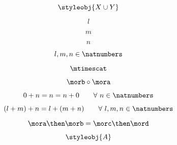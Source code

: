 {\begin{forslides}
        \begin{equation}
            \label{eq:37}
            \styleobj{X \cup Y}
        \end{equation}
        
        \begin{equation}
            \label{eq:38}
            l
        \end{equation}
        
        \begin{equation}
            \label{eq:39}
            m
        \end{equation}
        
        \begin{equation}
            \label{eq:40}
            n
        \end{equation}
        
        \begin{equation}
            \label{eq:41}
            l, m, n \in \natnumbers
        \end{equation}
        
        \begin{equation}
            \label{eq:42}
            \mtimescat
        \end{equation}
        
        \begin{equation}
            \label{eq:43}
            \morb \circ \mora
        \end{equation}
        
        \begin{equation}
            \label{eq:44}
            0 + n = n = n + 0   \quad \quad \forall \ n \in \natnumbers
        \end{equation}
        
        \begin{equation}
            \label{eq:45}
            (l + m) + n = l + (m + n) \quad \quad  \forall \ l, m, n \in \natnumbers
        \end{equation}
        
        \begin{equation}
            \label{eq:46}
            \mora \then \morb = \morc \then \mord
        \end{equation}
        
        \begin{equation}
            \label{eq:47}
            \styleobj{A}
        \end{equation}
        

\end{forslides}}
